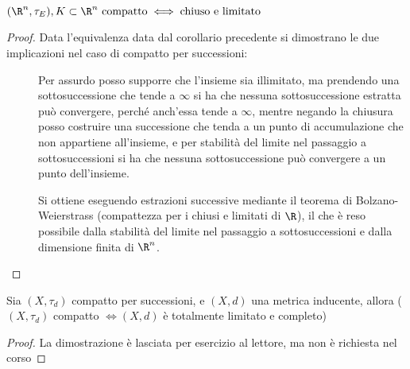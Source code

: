 \begin{prop}
$(\R^n, \tau _E), K\subset \R^n\text{ compatto} \iff\text{chiuso e limitato}$
\end{prop}
\begin{proof}
	Data l'equivalenza data dal corollario precedente si dimostrano le due implicazioni nel caso di compatto per successioni:
	\begin{description}
		\item[\proofrightarrow]
		Per assurdo posso supporre che l'insieme sia illimitato, ma prendendo una sottosuccessione che tende a $\infty$ si ha che nessuna sottosuccessione estratta può convergere, perché anch'essa tende a $\infty$, mentre negando la chiusura posso costruire una successione che tenda a un punto di accumulazione che non appartiene all'insieme, e per stabilità del limite nel passaggio a sottosuccessioni si ha che nessuna sottosuccessione può convergere a un punto dell'insieme.
		\item[\proofleftarrow]
		Si ottiene eseguendo estrazioni successive mediante il teorema di Bolzano-Weierstrass (compattezza per i chiusi e limitati di $\R$), il che è reso possibile dalla stabilità del limite nel passaggio a sottosuccessioni e dalla dimensione finita di $\R^n$.
	\end{description}
\end{proof}

\begin{teo}
Sia $(X,\tau _d)$ compatto per successioni, e $(X,d)$ una metrica inducente, allora ($(X,\tau _d)$ compatto $\iff (X,d)$ è totalmente limitato e completo)
\end{teo}
\begin{proof}
La dimostrazione è lasciata per esercizio al lettore, ma non è richiesta nel corso
\end{proof}
